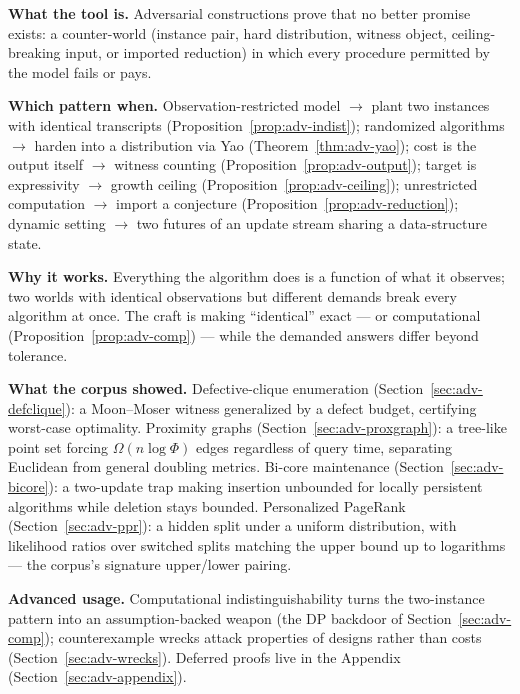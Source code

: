 \begin{recap}
\item \textbf{What the tool is.} Adversarial constructions prove that no better promise exists:
  a counter-world (instance pair, hard distribution, witness object, ceiling-breaking input,
  or imported reduction) in which every procedure permitted by the model fails or pays.
\item \textbf{Which pattern when.} Observation-restricted model $\to$ plant two instances with
  identical transcripts (Proposition~\ref{prop:adv-indist}); randomized algorithms $\to$ harden
  into a distribution via Yao (Theorem~\ref{thm:adv-yao}); cost is the output itself $\to$
  witness counting (Proposition~\ref{prop:adv-output}); target is expressivity $\to$ growth
  ceiling (Proposition~\ref{prop:adv-ceiling}); unrestricted computation $\to$ import a
  conjecture (Proposition~\ref{prop:adv-reduction}); dynamic setting $\to$ two futures of an
  update stream sharing a data-structure state.
\item \textbf{Why it works.} Everything the algorithm does is a function of what it observes;
  two worlds with identical observations but different demands break every algorithm at once.
  The craft is making ``identical'' exact --- or computational
  (Proposition~\ref{prop:adv-comp}) --- while the demanded answers differ beyond tolerance.
\item \textbf{What the corpus showed.} Defective-clique enumeration
  (Section~\ref{sec:adv-defclique}): a Moon--Moser witness generalized by a defect budget,
  certifying worst-case optimality. Proximity graphs (Section~\ref{sec:adv-proxgraph}): a
  tree-like point set forcing $\Omega(n\log\Phi)$ edges regardless of query time, separating
  Euclidean from general doubling metrics. Bi-core maintenance
  (Section~\ref{sec:adv-bicore}): a two-update trap making insertion unbounded for locally
  persistent algorithms while deletion stays bounded. Personalized PageRank
  (Section~\ref{sec:adv-ppr}): a hidden split under a uniform distribution, with likelihood
  ratios over switched splits matching the upper bound up to logarithms --- the corpus's
  signature upper/lower pairing.
\item \textbf{Advanced usage.} Computational indistinguishability turns the two-instance
  pattern into an assumption-backed weapon (the DP backdoor of
  Section~\ref{sec:adv-comp}); counterexample wrecks attack properties of designs rather than
  costs (Section~\ref{sec:adv-wrecks}). Deferred proofs live in the
  Appendix (Section~\ref{sec:adv-appendix}).
\end{recap}

